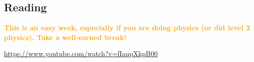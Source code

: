 


\subsection*{Reading}
\textcolor{orange}{\textbf{This is an easy week, especially if you are doing physics (or did level 2 physics). Take a well-earned break!}}

\begin{center}
\begin{tcolorbox}[width=0.8\textwidth,colback={red},title={\textbf{Go and watch...}},colbacktitle=yellow,coltitle=blue]
  \textcolor{white}{\url{https://www.youtube.com/watch?v=fIaupXkpB00}}
\end{tcolorbox}
\end{center}

